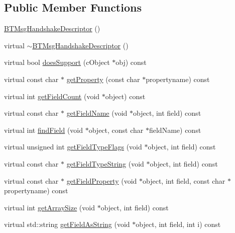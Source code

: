 \subsection*{Public Member Functions}
\begin{DoxyCompactItemize}
\item 
\hyperlink{classBTMsgHandshakeDescriptor_a5fda9a4a966ab4efea32f0a8ecf2ef0b}{B\+T\+Msg\+Handshake\+Descriptor} ()
\item 
virtual \hyperlink{classBTMsgHandshakeDescriptor_a37bfa90eaff226afb84bd0a7edf602fc}{$\sim$\+B\+T\+Msg\+Handshake\+Descriptor} ()
\item 
virtual bool \hyperlink{classBTMsgHandshakeDescriptor_a26459f2666aa12b086978673336cdf76}{does\+Support} (c\+Object $\ast$obj) const 
\item 
virtual const char $\ast$ \hyperlink{classBTMsgHandshakeDescriptor_a90345d1a7dda62b8283e95171ffe5214}{get\+Property} (const char $\ast$propertyname) const 
\item 
virtual int \hyperlink{classBTMsgHandshakeDescriptor_a2e13fe51475fc4605a8f4644cf31b9ca}{get\+Field\+Count} (void $\ast$object) const 
\item 
virtual const char $\ast$ \hyperlink{classBTMsgHandshakeDescriptor_a9719d0cde93050068881a2cd97e7c09d}{get\+Field\+Name} (void $\ast$object, int field) const 
\item 
virtual int \hyperlink{classBTMsgHandshakeDescriptor_a4696f87e1ce1d592b5032d4206730c07}{find\+Field} (void $\ast$object, const char $\ast$field\+Name) const 
\item 
virtual unsigned int \hyperlink{classBTMsgHandshakeDescriptor_af550d1b7e2bdb09cf3028757c74f3708}{get\+Field\+Type\+Flags} (void $\ast$object, int field) const 
\item 
virtual const char $\ast$ \hyperlink{classBTMsgHandshakeDescriptor_a14410ec69bf59de282de47956ac822fa}{get\+Field\+Type\+String} (void $\ast$object, int field) const 
\item 
virtual const char $\ast$ \hyperlink{classBTMsgHandshakeDescriptor_a53f586d34e2be99aec32eb0408ba3441}{get\+Field\+Property} (void $\ast$object, int field, const char $\ast$propertyname) const 
\item 
virtual int \hyperlink{classBTMsgHandshakeDescriptor_a1c6aa2247d7fa5a3d07d77fc0f0e6c76}{get\+Array\+Size} (void $\ast$object, int field) const 
\item 
virtual std\+::string \hyperlink{classBTMsgHandshakeDescriptor_a409e1dd2baf1ccc2239b5f4a6d385832}{get\+Field\+As\+String} (void $\ast$object, int field, int i) const 

\end{DoxyCompactItemize}
